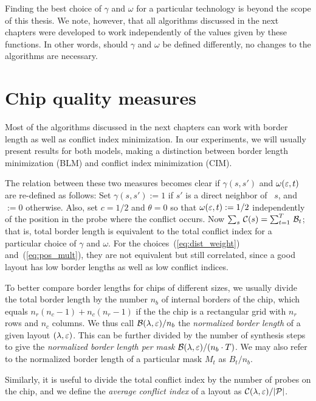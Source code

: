 Finding the best choice of $\gamma$ and $\omega$ for a particular technology is
beyond the scope of this thesis. We note, however, that all algorithms discussed
in the next chapters were developed to work independently of the values given by
these functions. In other words, should $\gamma$ and $\omega$ be defined
differently, no changes to the algorithms are necessary.

\section{Chip quality measures}
\label{sec:mlp_bl_vs_ci}

Most of the algorithms discussed in the next chapters can work with border
length as well as conflict index minimization. In our experiments, we will
usually present results for both models, making a distinction between border
length minimization (BLM) and conflict index minimization (CIM).

The relation between these two
measures becomes clear if $\gamma(s,s')$ and $\omega(\varepsilon,t)$ are re-defined as
follows: Set $\gamma(s,s') := 1$ if $s'$ is a direct neighbor of~ $s$, and $:=0$
otherwise. Also, set $c=1/2$ and $\theta=0$ so that $\omega(\varepsilon,t) := 1/2$
independently of the position in the probe where the conflict occurs. Now
$\sum_s\, {\mathcal{C}}(s) = \sum_{t=1}^T\, {\mathcal{B}}_t$; that is, total border length is
equivalent to the total conflict index for a particular choice of $\gamma$ and
$\omega$. For the choices~(\ref{eq:dist_weight}) and~(\ref{eq:pos_mult}), they
are not equivalent but still correlated, since a good layout has low border
lengths as well as low conflict indices.

To better compare border lengths for chips of different sizes, we usually divide
the total border length by the number $n_b$ of internal borders of the chip,
which equals $n_r(n_c - 1) + n_c(n_r - 1)$ if the the chip is a rectangular grid
with $n_r$ rows and $n_c$ columns. We thus call ${\mathcal{B}}(\lambda,\varepsilon)/n_b$ the
\emph{normalized border length} of a given layout $(\lambda,\varepsilon)$. This can be
further divided by the number of synthesis steps to give the \emph{normalized
border length per mask} ${\mathcal{B}}(\lambda,\varepsilon)/(n_b \cdot T)$. We may also refer
to the normalized border length of a particular mask $M_t$ as $B_t/n_b$.

Similarly, it is useful to divide the total conflict index by the number of
probes on the chip, and we define the \emph{average conflict index} of a layout
as ${\mathcal{C}}(\lambda,\varepsilon)/|{\mathcal{P}}|$.

